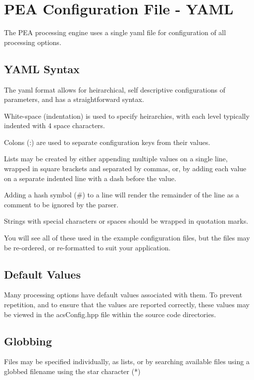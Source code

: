 











\chapter{PEA Configuration File - YAML}
	
The PEA processing engine uses a single yaml file for configuration of all processing options.

\section{YAML Syntax}
The yaml format allows for heirarchical, self descriptive configurations of parameters, and has a straightforward syntax.

White-space (indentation) is used to specify heirarchies, with each level typically indented with 4 space characters.

Colons (:) are used to separate configuration keys from their values.

Lists may be created by either appending multiple values on a single line, wrapped in square brackets and separated by commas, or, by adding each value on a separate indented line with a dash before the value.

Adding a hash symbol (\#) to a line will render the remainder of the line as a comment to be ignored by the parser.

Strings with special characters or spaces should be wrapped in quotation marks.

You will see all of these used in the example configuration files, but the files may be re-ordered, or re-formatted to suit your application.

\section{Default Values}

Many processing options have default values associated with them. To prevent repetition, and to ensure that the values are reported correctly, these values may be viewed in the acsConfig.hpp file within the source code directories.


\section{Globbing}
Files may be specified individually, as lists, or by searching available files using a globbed filename using the star character (*)

